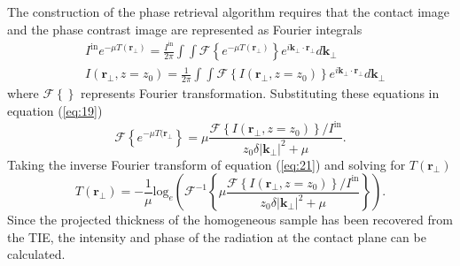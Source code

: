 \documentclass[10pt, a4paper, singlespacing]{report}
\begin{document}
The construction of the phase retrieval algorithm requires that the contact image and the phase contrast image are represented as Fourier integrals\cite{Pags2002}
\begin{align}\label{eq:20}
&I^{\mathrm{in}} e^{-\mu T(\mathbf{r}_{\perp})} = \frac{I^{\mathrm{in}}}{2 \pi} \int \int \mathscr{F} \left \{ e^{-\mu T(\mathbf{r}_{\perp})} \right \} e^{i \mathbf{k}_{\perp}\cdot \mathbf{r}_{\perp}} d \mathbf{k}_{\perp}
\\&I(\mathbf{r}_{\perp}, z=z_0) = \frac{1}{2 \pi}  \int \int \mathscr{F} \left \{ I (\mathbf{r}_{\perp}, z = z_0) \right \} e^{i \mathbf{k}_{\perp}\cdot \mathbf{r}_{\perp}} d \mathbf{k}_{\perp}
\end{align}
where $\mathscr{F}\left \{ \right \}$ represents Fourier transformation. Substituting these equations in equation (\ref{eq:19})
\begin{equation}\label{eq:21}
\mathscr{F}\left \{ e^{-\mu T(\mathbf{r}_{\perp}} \right \} = \mu \frac{\mathscr{F}\left \{ I(\mathbf{r}_{\perp}, z=z_0)\right \}/I^{\mathrm{in}}}{z_0 \delta |\mathbf{k}_{\perp}|^{2} + \mu}.
\end{equation}
Taking the inverse Fourier transform of equation (\ref{eq:21}) and solving for $T(\mathbf{r}_{\perp})$
\begin{equation}\label{eq:22}
T(\mathbf{r}_{\perp}) = - \frac{1}{\mu} \mathrm{log}_{e} \left ( \mathscr{F}^{-1} \left \{ \mu \frac{ \mathscr{F} \left \{I(\mathbf{r}_{\perp}, z=z_0) \right \} /  I^{\mathrm{in}}}{z_0 \delta |\mathbf{k}_{\perp}|^{2} + \mu}  \right \} \right ).
\end{equation}
Since the projected thickness of the homogeneous sample has been recovered from the TIE, the intensity and phase of the radiation at the contact plane can be calculated.

\end{document}
